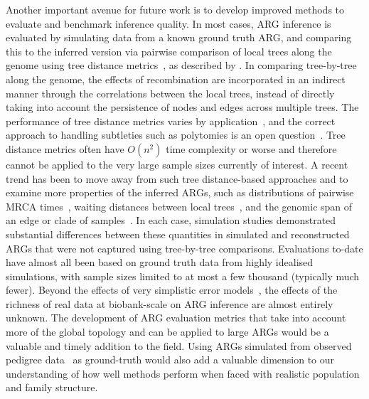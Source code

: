 \documentclass{article}
\begin{document}
Another important avenue for future work is to develop improved methods 
to evaluate and benchmark inference quality.
In most cases,
ARG inference is evaluated by simulating data from a known ground truth ARG,
and comparing this to the inferred version via pairwise comparison of
local trees along the genome using tree distance
metrics~\citep[e.g.][]{robinson1981comparison,kendall2016mapping},
as described by \citet{kuhner2015assessing}.
In comparing tree-by-tree along the genome, the effects of recombination
are incorporated in an indirect manner through the correlations
between the local trees, instead of directly taking into account
the persistence of nodes and edges across multiple trees.
The performance of tree distance metrics varies by
application~\citep{kuhner2015practical}, and the correct approach
to handling subtleties such as polytomies
is an open question~\citep{kelleher2019inferring,zhang2023biobank}.
Tree distance metrics often have $O(n^2)$ time complexity or worse
and therefore cannot be
applied to the very large sample sizes currently of interest.
A recent trend has been to move away from such
tree distance-based approaches and to examine more
properties of the inferred ARGs, such as
distributions of pairwise MRCA times~\citep{brandt2021evaluation},
waiting distances between local trees~\citep{deng2021distribution},
and the genomic span of an edge or clade of
samples~\citep{ignatieva2023distribution}.
In each case, simulation studies demonstrated
substantial differences between these quantities in simulated and
reconstructed ARGs
that were not captured using tree-by-tree comparisons.
Evaluations to-date have almost all been based
on ground truth data from highly idealised simulations,
with sample sizes limited to at most a few thousand (typically much fewer).
Beyond the effects of very simplistic error models~\cite[e.g.][]{kelleher2019inferring},
the effects of the richness of real data
at biobank-scale on ARG inference are almost entirely unknown.
The development of ARG evaluation metrics that take into account more of the
global topology and can be applied to large ARGs would be a
valuable and timely addition to the field.
Using ARGs simulated from observed pedigree data~\citep{anderson2022genes} as
ground-truth would also add a valuable dimension to
our understanding of how well methods perform when faced with
realistic population and family structure.
\end{document}
